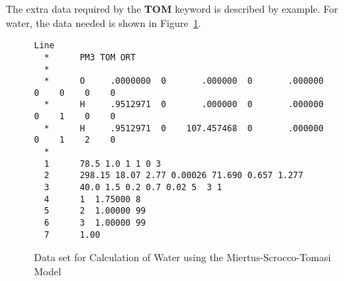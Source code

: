 The extra data required by the {\bf TOM} keyword is described by example.
For water, the data needed is shown in Figure~\ref{tomdata}.
\begin{figure}[hbt]
\caption{\label{tomdata}Data set for Calculation of Water using the Miertus-Scrocco-Tomasi Model}
\begin{verbatim}
Line
  *      PM3 TOM ORT
  *
  *      O     .0000000  0       .000000  0       .000000  0    0    0    0
  *      H     .9512971  0       .000000  0       .000000  0    1    0    0
  *      H     .9512971  0    107.457468  0       .000000  0    1    2    0
  *
  1      78.5 1.0 1 1 0 3
  2      298.15 18.07 2.77 0.00026 71.690 0.657 1.277
  3      40.0 1.5 0.2 0.7 0.02 5  3 1
  4      1  1.75000 8
  5      2  1.00000 99
  6      3  1.00000 99
  7      1.00
\end{verbatim}
\end{figure}

